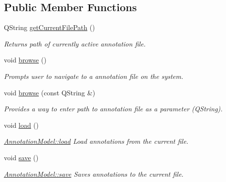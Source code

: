 \subsection*{Public Member Functions}
\begin{DoxyCompactItemize}
\item 
Q\+String \hyperlink{classAnnotationModel_a704170b9d4cc9e6b62e0bc22d17f6e17}{get\+Current\+File\+Path} ()
\begin{DoxyCompactList}\small\item\em Returns path of currently active annotation file. \end{DoxyCompactList}\item 
void \hyperlink{classAnnotationModel_aa43f69c5431ede4dc744ae9b61b49f6c}{browse} ()
\begin{DoxyCompactList}\small\item\em Prompts user to navigate to a annotation file on the system. \end{DoxyCompactList}\item 
void \hyperlink{classAnnotationModel_a54f9ffa4151a1bdcaa1d5ab3dee87679}{browse} (const Q\+String \&)
\begin{DoxyCompactList}\small\item\em Provides a way to enter path to annotation file as a parameter (Q\+String). \end{DoxyCompactList}\item 
\mbox{\label{classAnnotationModel_acccb7d1577b24c289e43bc4f4cd7c92d}} 
void \hyperlink{classAnnotationModel_acccb7d1577b24c289e43bc4f4cd7c92d}{load} ()
\begin{DoxyCompactList}\small\item\em \hyperlink{classAnnotationModel_acccb7d1577b24c289e43bc4f4cd7c92d}{Annotation\+Model\+::load} Load annotations from the current file. \end{DoxyCompactList}\item 
\mbox{\label{classAnnotationModel_a4ae0ad72d52d23ad24b611eb50f14708}} 
void \hyperlink{classAnnotationModel_a4ae0ad72d52d23ad24b611eb50f14708}{save} ()
\begin{DoxyCompactList}\small\item\em \hyperlink{classAnnotationModel_a4ae0ad72d52d23ad24b611eb50f14708}{Annotation\+Model\+::save} Saves annotations to the current file. \end{DoxyCompactList}\item 

\end{DoxyCompactItemize}
